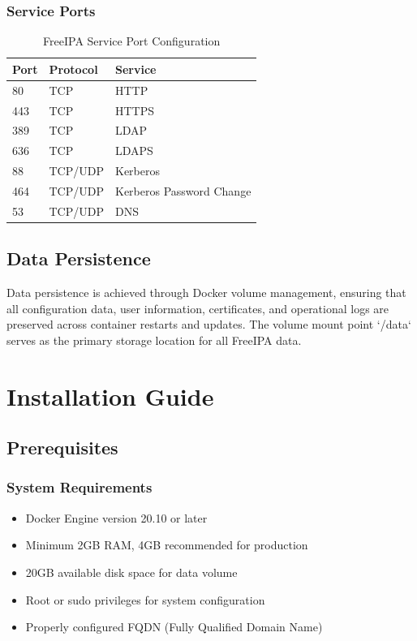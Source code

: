 \documentclass[12pt,a4paper]{report}
\begin{document}
\subsection{Service Ports}

\begin{table}[H]
    \centering
    \caption{FreeIPA Service Port Configuration}
    \label{tab:ports}
    \begin{tabular}{lll}
        \toprule
        \textbf{Port} & \textbf{Protocol} & \textbf{Service} \\
        \midrule
        80 & TCP & HTTP \\
        443 & TCP & HTTPS \\
        389 & TCP & LDAP \\
        636 & TCP & LDAPS \\
        88 & TCP/UDP & Kerberos \\
        464 & TCP/UDP & Kerberos Password Change \\
        53 & TCP/UDP & DNS \\
        \bottomrule
    \end{tabular}
\end{table}

\section{Data Persistence}

Data persistence is achieved through Docker volume management, ensuring that all configuration data, user information, certificates, and operational logs are preserved across container restarts and updates. The volume mount point `/data` serves as the primary storage location for all FreeIPA data.

\chapter{Installation Guide}

\section{Prerequisites}

\subsection{System Requirements}

\begin{itemize}
    \item Docker Engine version 20.10 or later
    \item Minimum 2GB RAM, 4GB recommended for production
    \item 20GB available disk space for data volume
    \item Root or sudo privileges for system configuration
    \item Properly configured FQDN (Fully Qualified Domain Name)
\end{itemize}
\end{document}

